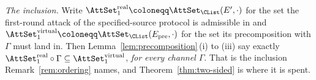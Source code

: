 \begin{remark}
\emph{The inclusion.} Write
$\AttSet^{\mathrm{real}}_1\coloneqq\AttSet_{\CList}(E',\cdot)$ for the set the
first-round attack of the specified-source protocol is admissible in and
$\AttSet^{\mathrm{virtual}}_1\coloneqq
\AttSet_{\CList}(E_{\mathrm{pre}},\cdot)$ for the set its precomposition with
$\Gamma$ must land in. Then Lemma~\ref{lem:precomposition}\,(i) to (iii) say
exactly
$\AttSet^{\mathrm{real}}_1\circ\Gamma\subseteq\AttSet^{\mathrm{virtual}}_1$,
\emph{for every channel $\Gamma$}. That is the inclusion
Remark~\ref{rem:ordering} names, and Theorem~\ref{thm:two-sided} is where it
is spent.
\end{remark}
